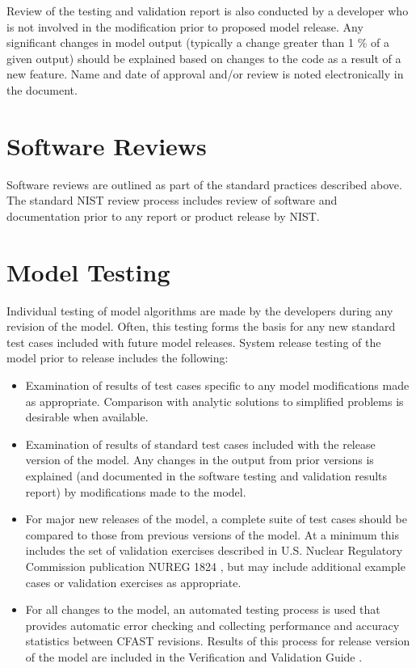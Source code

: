 \documentclass[12pt]{book}
\begin{document}
Review of the testing and validation report is also conducted by a developer who is not involved in the modification prior to proposed model release. Any significant changes in model output (typically a change greater than 1 \% of a given output) should be explained based on changes to the code as a result of a new feature.  Name and date of approval and/or review is noted electronically in the document.

\section{Software Reviews}

Software reviews are outlined as part of the standard practices described above.  The standard NIST review process includes review of software and documentation prior to any report or product release by NIST.

\section{Model Testing}

Individual testing of model algorithms are made by the developers during any revision of the model. Often, this testing forms the basis for any new standard test cases included with future model releases. System release testing of the model prior to release includes the following:

\begin{itemize}
\item Examination of results of test cases specific to any model modifications made as appropriate.  Comparison with analytic solutions to simplified problems is desirable when available.

\item Examination of results of standard test cases included with the release version of the model. Any changes in the output from prior versions is explained (and documented in the software testing and validation results report) by modifications made to the model.

\item For major new releases of the model, a complete suite of test cases should be compared to those from previous versions of the model.  At a minimum this includes the set of validation exercises described in U.S. Nuclear Regulatory Commission publication NUREG 1824 \cite{NRCNUREG1824}, but may include additional example cases or validation exercises as appropriate.

\item For all changes to the model, an automated testing process is used that provides automatic error checking and collecting performance and accuracy statistics between CFAST revisions. Results of this process for release version of the model are included in the Verification and Validation Guide \cite{CFAST_Valid_Guide_7}.
\end{itemize}
\end{document}
